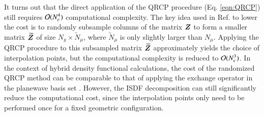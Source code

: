 It turns out that the direct application of the QRCP procedure (Eq. 
\ref{eqn:QRCP}) still requires $\mathcal{O}(N_{e}^{4})$ computational complexity.  The
key idea used in Ref. \cite{JCP_302_329_2015_ISDF} to lower the cost is to
randomly subsample columns of the matrix $\bm{Z}$ to form a smaller matrix
$\widetilde{\bm{Z}}$ of size $N_{g}\times \widetilde{N}_\mu$, where $\widetilde{N}_\mu$ is
only slightly larger than $N_{\mu}$.  Applying the QRCP procedure to this
subsampled matrix $\widetilde{\bm{Z}}$ approximately yields the choice of interpolation
points, but the computational complexity is reduced to $\mathcal{O}(N_{e}^3)$. In the
context of hybrid density functional calculations, the cost of the randomized
QRCP method can be comparable to that of applying the exchange operator in the
planewave basis set \cite{JCTC_2017_ISDF}. However, the ISDF decomposition can
still significantly reduce the computational cost, since the interpolation
points only need to be performed once for a fixed geometric configuration.